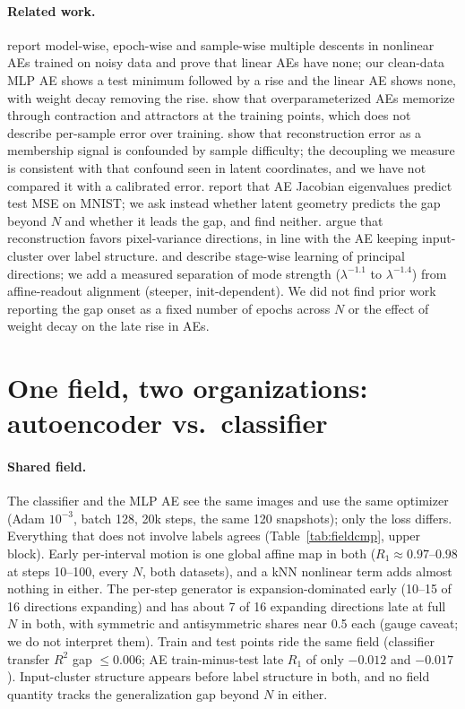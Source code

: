 \documentclass[10pt]{article}
\begin{document}
\paragraph{Related work.} \citet{rahimi2025unveiling} report model-wise, epoch-wise and sample-wise multiple descents in nonlinear AEs trained on noisy data and prove that linear AEs have none; our clean-data MLP AE shows a test minimum followed by a rise and the linear AE shows none, with weight decay removing the rise. \citet{radhakrishnan2018memorization,radhakrishnan2020overparameterized} show that overparameterized AEs memorize through contraction and attractors at the training points, which does not describe per-sample error over training. \citet{shafran2021membership} show that reconstruction error as a membership signal is confounded by sample difficulty; the decoupling we measure is consistent with that confound seen in latent coordinates, and we have not compared it with a calibrated error. \citet{agarwala2022geometry} report that AE Jacobian eigenvalues predict test MSE on MNIST; we ask instead whether latent geometry predicts the gap beyond $N$ and whether it leads the gap, and find neither. \citet{balestriero2024learning} argue that reconstruction favors pixel-variance directions, in line with the AE keeping input-cluster over label structure. \citet{saxe2014exact,saxe2019mathematical} and \citet{bao2020regularized} describe stage-wise learning of principal directions; we add a measured separation of mode strength ($\lambda^{-1.1}$ to $\lambda^{-1.4}$) from affine-readout alignment (steeper, init-dependent). We did not find prior work reporting the gap onset as a fixed number of epochs across $N$ or the effect of weight decay on the late rise in AEs.

\section{One field, two organizations: autoencoder vs.\ classifier}\label{sec:cmp}
\paragraph{Shared field.} The classifier and the MLP AE see the same images and use the same optimizer (Adam $10^{-3}$, batch 128, 20k steps, the same 120 snapshots); only the loss differs. Everything that does not involve labels agrees (Table~\ref{tab:fieldcmp}, upper block). Early per-interval motion is one global affine map in both ($R_1\approx0.97$--$0.98$ at steps 10--100, every $N$, both datasets), and a kNN nonlinear term adds almost nothing in either. The per-step generator is expansion-dominated early (10--15 of 16 directions expanding) and has about 7 of 16 expanding directions late at full $N$ in both, with symmetric and antisymmetric shares near 0.5 each (gauge caveat; we do not interpret them). Train and test points ride the same field (classifier transfer $R^2$ gap $\le0.006$; AE train-minus-test late $R_1$ of only $-0.012$ and $-0.017$). Input-cluster structure appears before label structure in both, and no field quantity tracks the generalization gap beyond $N$ in either.
\end{document}
